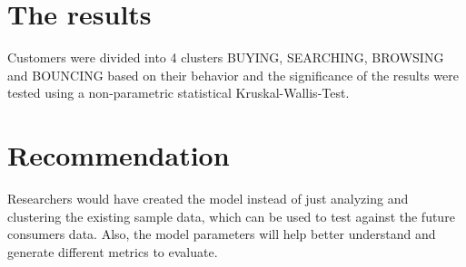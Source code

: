 \documentclass[a4paper]{article}
\begin{document}
\section{The results}
 
Customers were divided into 4 clusters BUYING, SEARCHING, BROWSING and BOUNCING based on their behavior and the significance of the results were tested using a non-parametric statistical Kruskal-Wallis-Test.

\section{Recommendation}

Researchers would have created the model instead of just analyzing and clustering the existing sample data, which can be used to test against the future consumers data. Also, the model parameters will help better understand and generate different metrics to evaluate. 
\end{document}
